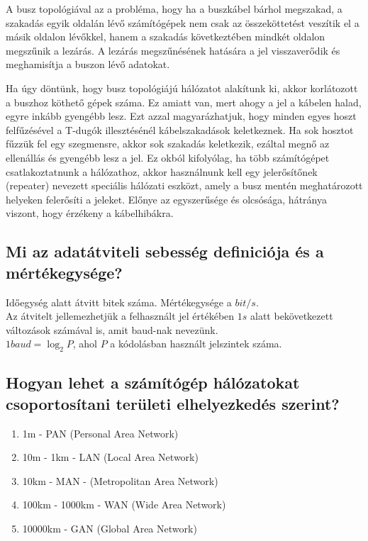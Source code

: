 \documentclass[12pt, a4paper]{article}
\begin{document}
\begin{enumerate}
A busz topológiával az a probléma, hogy ha a buszkábel bárhol megszakad, a szakadás egyik oldalán lévő számítógépek nem csak az összeköttetést veszítik el a másik oldalon lévőkkel, hanem a szakadás következtében mindkét oldalon megszűnik a lezárás. A lezárás megszűnésének hatására a jel visszaverődik és meghamisítja a buszon lévő adatokat.

Ha úgy döntünk, hogy busz topológiájú hálózatot alakítunk ki, akkor korlátozott a buszhoz köthető gépek száma. Ez amiatt van, mert ahogy a jel a kábelen halad, egyre inkább gyengébb lesz. Ezt azzal magyarázhatjuk, hogy minden egyes hoszt felfűzésével a T-dugók illesztésénél kábelszakadások keletkeznek. Ha sok hosztot fűzzük fel egy szegmensre, akkor sok szakadás keletkezik, ezáltal megnő az ellenállás és gyengébb lesz a jel. Ez okból kifolyólag, ha több számítógépet csatlakoztatnunk a hálózathoz, akkor használnunk kell egy jelerősítőnek (repeater) nevezett speciális hálózati eszközt, amely a busz mentén meghatározott helyeken felerősíti a jeleket. Előnye az egyszerűsége és olcsósága, hátránya viszont, hogy érzékeny a kábelhibákra.
\subsection{Mi az adatátviteli sebesség definiciója és a mértékegysége?}
Időegység alatt átvitt bitek száma. Mértékegysége a $bit/s$.\\Az átvitelt jellemezhetjük a felhasznált jel értékében $1 s$ alatt bekövetkezett változások számával is, amit baud-nak nevezünk.\\
$1 baud = \log_2 P$, ahol $P$ a kódolásban használt jelszintek száma.
\end{enumerate}
\subsection{Hogyan lehet a számítógép hálózatokat csoportosítani területi elhelyezkedés szerint?}
\begin{enumerate}
\item
1m - PAN (Personal Area Network)
\item
10m - 1km - LAN (Local Area Network)
\item
10km - MAN - (Metropolitan Area Network)
\item
100km - 1000km - WAN (Wide Area Network)
\item
10000km - GAN (Global Area Network) 
\end{enumerate}
\end{document}
